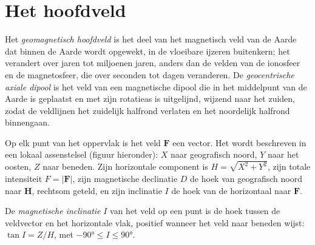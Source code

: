 \section{Het hoofdveld}

\begin{definition}\label{def:b3:palaeomagnetism:main-field}
Het \emph{geomagnetisch hoofdveld} is het deel van
het magnetisch veld van de Aarde dat binnen de Aarde wordt opgewekt, in de vloeibare ijzeren
buitenkern; het verandert over jaren tot miljoenen jaren, anders dan de velden van de
ionosfeer en de magnetosfeer, die over seconden tot dagen veranderen. De
\emph{geocentrische axiale dipool} is het veld van een
magnetische dipool die in het middelpunt van de Aarde is geplaatst en met zijn rotatieas is
uitgelijnd, wijzend naar het zuiden, zodat de veldlijnen het zuidelijk halfrond verlaten en
het noordelijk halfrond binnengaan.
\end{definition}

Op elk punt van het oppervlak is het veld $\mathbf F$ een vector. Het wordt
beschreven in een lokaal assenstelsel (figuur hieronder): $X$ naar geografisch noord, $Y$ naar het
oosten, $Z$ naar beneden. Zijn horizontale component is $H = \sqrt{X^2 + Y^2}$, zijn
totale intensiteit $F = |\mathbf F|$, zijn magnetische declinatie $D$ de hoek van
geografisch noord naar $\mathbf H$, rechtsom geteld, en zijn inclinatie $I$ de
hoek van de horizontaal naar $\mathbf F$.

\begin{definition}\label{def:b3:palaeomagnetism:inclination}
De \emph{magnetische inclinatie} $I$ van het veld op
een punt is de hoek tussen de veldvector en het horizontale vlak,
positief wanneer het veld naar beneden wijst: $\tan I = Z/H$, met $-\ang{90} \le I
\le \ang{90}$.
\end{definition}

